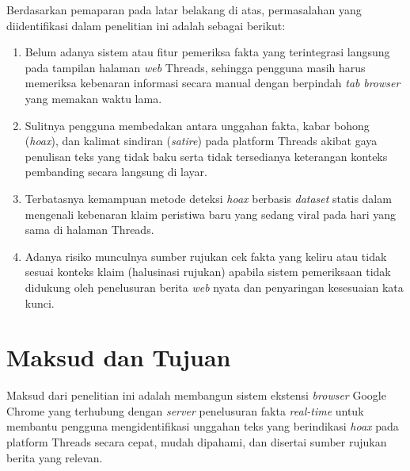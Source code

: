 \documentclass[12pt,a4paper,twoside]{report}
\begin{document}
Berdasarkan pemaparan pada latar belakang di atas, permasalahan yang diidentifikasi dalam penelitian ini adalah sebagai berikut:
\begin{enumerate}[leftmargin=0.8cm,itemsep=3pt,topsep=2pt]
  \item Belum adanya sistem atau fitur pemeriksa fakta yang terintegrasi langsung pada tampilan halaman \textit{web} Threads, sehingga pengguna masih harus memeriksa kebenaran informasi secara manual dengan berpindah \textit{tab} \textit{browser} yang memakan waktu lama.
  \item Sulitnya pengguna membedakan antara unggahan fakta, kabar bohong (\textit{hoax}), dan kalimat sindiran (\textit{satire}) pada platform Threads akibat gaya penulisan teks yang tidak baku serta tidak tersedianya keterangan konteks pembanding secara langsung di layar.
  \item Terbatasnya kemampuan metode deteksi \textit{hoax} berbasis \textit{dataset} statis dalam mengenali kebenaran klaim peristiwa baru yang sedang viral pada hari yang sama di halaman Threads.
  \item Adanya risiko munculnya sumber rujukan cek fakta yang keliru atau tidak sesuai konteks klaim (halusinasi rujukan) apabila sistem pemeriksaan tidak didukung oleh penelusuran berita \textit{web} nyata dan penyaringan kesesuaian kata kunci.
\end{enumerate}

\section{Maksud dan Tujuan}

Maksud dari penelitian ini adalah membangun sistem ekstensi \textit{browser} Google Chrome yang terhubung dengan \textit{server} penelusuran fakta \textit{real-time} untuk membantu pengguna mengidentifikasi unggahan teks yang berindikasi \textit{hoax} pada platform Threads secara cepat, mudah dipahami, dan disertai sumber rujukan berita yang relevan.
\end{document}
